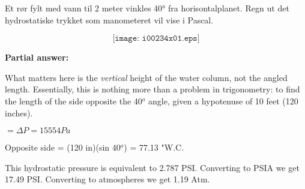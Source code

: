 
Et rør fylt med vann til 2 meter vinkles 40° fra horisontalplanet. Regn ut det hydrostatiske trykket som manometeret vil vise i Pascal. 

$$\texttt{[image: i00234x01.eps]}$$







\noindent
{\bf Partial answer:}

\vskip 10pt

What matters here is the {\it vertical} height of the water column, not the angled length.  Essentially, this is nothing more than a problem in trigonometry: to find the length of the side opposite the 40$^{o}$ angle, given a hypotenuse of 10 feet (120 inches).

$=\Delta P = 15554 Pa$






Opposite side = (120 in)(sin 40$^{o}$) = 77.13 "W.C.

\vskip 10pt

This hydrostatic pressure is equivalent to 2.787 PSI.  Converting to PSIA we get 17.49 PSI.  Converting to atmospheres we get 1.19 Atm.





